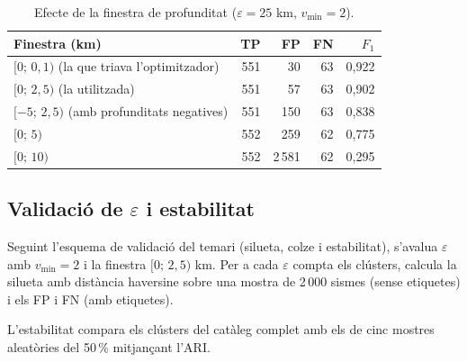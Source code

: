 \documentclass[a4paper,11pt]{article}
\begin{document}
\begin{table}[H]
\centering
\begin{tabular}{@{}lrrrr@{}}
\toprule
Finestra (km) & TP & FP & FN & $F_1$ \\
\midrule
$[0;\,0{,}1)$ (la que triava l'optimitzador) & 551 & 30 & 63 & 0,922 \\
$[0;\,2{,}5)$ (la utilitzada) & 551 & 57 & 63 & 0,902 \\
$[-5;\,2{,}5)$ (amb profunditats negatives) & 551 & 150 & 63 & 0,838 \\
$[0;\,5)$ & 552 & 259 & 62 & 0,775 \\
$[0;\,10)$ & 552 & 2\,581 & 62 & 0,295 \\
\bottomrule
\end{tabular}
\caption{Efecte de la finestra de profunditat ($\varepsilon=25$ km, $v_{\min}=2$).}
\end{table}

\subsection{Validació de $\varepsilon$ i estabilitat}
Seguint l'esquema de validació del temari (silueta, colze i estabilitat), s'avalua $\varepsilon$ amb $v_{\min}=2$ i la finestra $[0;\,2{,}5)$ km. Per a cada $\varepsilon$ compta els clústers, calcula la silueta amb distància
haversine sobre una mostra de 2\,000 sismes (sense etiquetes) i els FP i FN (amb etiquetes).

L'estabilitat compara els clústers del catàleg complet amb els de cinc mostres aleatòries del 50\,\% mitjançant l'ARI.
\end{document}
